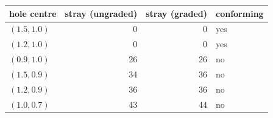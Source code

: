 \begin{tabular}{@{}l r r l@{}}
\toprule
hole centre & stray (ungraded) & stray (graded) & conforming \\
\midrule
$(1.5, 1.0)$ & 0 & 0 & yes \\
$(1.2, 1.0)$ & 0 & 0 & yes \\
$(0.9, 1.0)$ & 26 & 26 & no \\
$(1.5, 0.9)$ & 34 & 36 & no \\
$(1.2, 0.9)$ & 36 & 36 & no \\
$(1.0, 0.7)$ & 43 & 44 & no \\
\bottomrule
\end{tabular}

